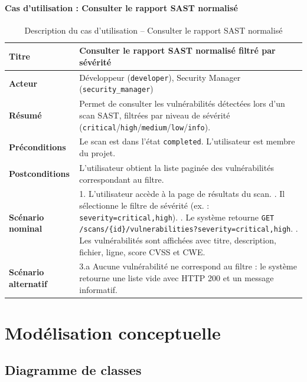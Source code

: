 \paragraph{Cas d'utilisation : Consulter le rapport SAST normalisé}
\begin{table}[H]
\centering
\caption{Description du cas d'utilisation -- Consulter le rapport SAST normalisé}
\label{tab:uc-sast-report}
\small
\renewcommand{\arraystretch}{1.3}
\begin{tabularx}{\textwidth}{>{\bfseries}p{3.5cm} X}
\hline
Titre & Consulter le rapport SAST normalisé filtré par sévérité \\
\hline
Acteur & Développeur (\texttt{developer}), Security Manager (\texttt{security\_manager}) \\
\hline
Résumé & Permet de consulter les vulnérabilités détectées lors d'un scan SAST, filtrées par niveau de sévérité (\texttt{critical}/\texttt{high}/\texttt{medium}/\texttt{low}/\texttt{info}). \\
\hline
Préconditions & Le scan est dans l'état \texttt{completed}. L'utilisateur est membre du projet. \\
\hline
Postconditions & L'utilisateur obtient la liste paginée des vulnérabilités correspondant au filtre. \\
\hline
Scénario nominal &
1. L'utilisateur accède à la page de résultats du scan. \newline
2. Il sélectionne le filtre de sévérité (ex. : \texttt{severity=critical,high}). \newline
3. Le système retourne \texttt{GET /scans/\{id\}/vulnerabilities?severity=critical,high}. \newline
4. Les vulnérabilités sont affichées avec titre, description, fichier, ligne, score CVSS et CWE. \\
\hline
Scénario alternatif &
3.a Aucune vulnérabilité ne correspond au filtre : le système retourne une liste vide avec HTTP 200 et un message informatif. \\
\hline
\end{tabularx}
\end{table}

\section{Modélisation conceptuelle}

\subsection{Diagramme de classes}

